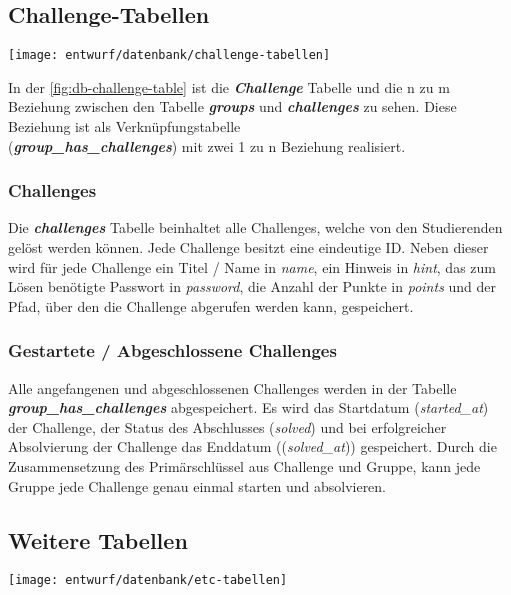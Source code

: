 \subsection{Challenge-Tabellen}
\begin{center}
	\texttt{[image: entwurf/datenbank/challenge-tabellen]}
	\label{fig:db-challenge-table}
\end{center}
In der \autoref{fig:db-challenge-table} ist die \textbf{\textit{Challenge}} Tabelle und die n zu m Beziehung zwischen den Tabelle \textbf{\textit{groups}} und \textbf{\textit{challenges}} zu sehen. Diese Beziehung ist als Verknüpfungstabelle\\ (\textbf{\textit{group\_has\_challenges}}) mit zwei 1 zu n Beziehung realisiert.

\subsubsection{Challenges}
Die \textbf{\textit{challenges}} Tabelle beinhaltet alle Challenges, welche von den Studierenden gelöst werden können. Jede Challenge besitzt eine eindeutige ID. Neben dieser wird für jede Challenge ein Titel / Name in \textit{name}, ein Hinweis in \textit{hint}, das zum Lösen benötigte Passwort in \textit{password}, die Anzahl der Punkte in \textit{points} und der Pfad, über den die Challenge abgerufen werden kann, gespeichert.

\subsubsection{Gestartete / Abgeschlossene Challenges}
Alle angefangenen und abgeschlossenen Challenges werden in der Tabelle \textbf{\textit{group\_has\_challenges}} abgespeichert. Es wird das Startdatum (\textit{started\_at}) der Challenge, der Status des Abschlusses (\textit{solved}) und bei erfolgreicher Absolvierung der Challenge das Enddatum ((\textit{solved\_at})) gespeichert. Durch die Zusammensetzung des Primärschlüssel aus Challenge und Gruppe, kann jede Gruppe jede Challenge genau einmal starten und absolvieren.

\subsection{Weitere Tabellen}
\begin{center}
	\texttt{[image: entwurf/datenbank/etc-tabellen]}
	\label{fig:db-etc-table}
\end{center}

